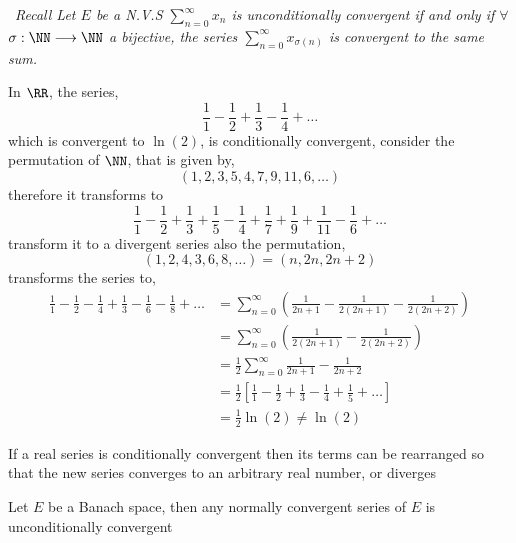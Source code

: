 % 
% 
% 
\lecday[2025-04-08]

% 
	\divider	
	\lefthand ~\it Recall \normalfont
                Let $E $ be a N.V.S 
		$\sum_{n=0}^{\infty}  x_{n} $ is unconditionally convergent 
		if and only if 
		$\forall  $  $ \sigma    : \NN \longrightarrow \NN $ a bijective, 
		the series $\sum_{n=0}^{\infty}  x_{\sigma (n)   } $ is convergent to the same
		sum.
	\divider	
	\begin{example}
	In $\RR  $, the series,
	\[
	\frac{1}{1} - \frac{1}{2} + 
	\frac{1}{3} - 
	\frac{1}{4} + \hdots 
	\]
	which is convergent to $\ln{(2) } $, is conditionally convergent, consider the permutation of 
	$\NN$, that is given by, 
	\[
		(1, 2, 3, 5, 4, 7, 9, 11, 6, \hdots ) 
	\]
	therefore it transforms to 
	\[
	\frac{1}{1} - \frac{1}{2} + \frac{1}{3} + \frac{1}{5} - \frac{1}{4} + \frac{1}{7} + 
	\frac{1}{9} + \frac{1}{11} - \frac{1}{6} + \hdots 
	\]
	transform it to a divergent series also the permutation, 
	\[
		(1, 2, 4, 3, 6, 8, \hdots )  = (n, 2n, 2n+2)  
	\]
	transforms the series to, 
	\begin{align*}
		\frac{1}{1} - \frac{1}{2} - \frac{1}{4}+  \frac{1}{3} - \frac{1}{6} - \frac{1}{8} + \hdots  &=
	\sum_{n=0}^{\infty}  \left( 
	\frac{1}{2n+1} - \frac{1}{2(2n+1) } - \frac{1}{2(2n+2) }\right) \\ 
&= \sum_{n=0}^{\infty}  \left( \frac{1}{2(2n+1) } - \frac{1}{2(2n+2) } \right) \\
&= \frac{1}{2} \sum_{n=0}^{\infty}  \frac{1}{2n+1} - \frac{1}{2n+2} \\
&= \frac{1}{2}
\left[ 
	\frac{1}{1} - \frac{1}{2} + \frac{1}{3} - \frac{1}{4} + \frac{1}{5} + \hdots 
\right] \\
&= \frac{1}{2} \ln{(2)} \neq  \ln{(2)}
	\end{align*}
	\end{example}
	\begin{theorem}
		If a real series is conditionally convergent 
		then its terms can be rearranged so that the new series converges
		to an arbitrary real number, or diverges
	\end{theorem}
	\begin{theorem}[]
	Let $E $ be a Banach space, then any normally convergent series of $E $ is unconditionally
	convergent 
	\end{theorem}

